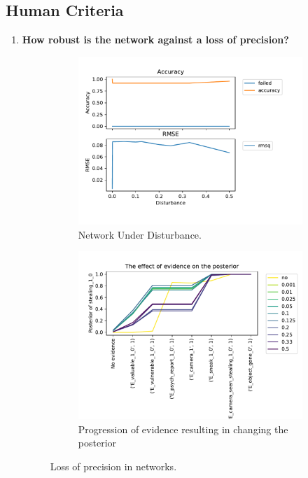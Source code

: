 \subsection{Human Criteria}
\begin{enumerate}
\item \textbf{How robust is the network against a loss of precision?}

\begin{figure}[htbp]
\begin{center}
\begin{subfigure}{.5\textwidth}
\includegraphics[width=0.9\linewidth]{../experiments/GroteMarkt/plots/performance_GroteMarkt.pdf}
\caption{Network Under Disturbance.}
\label{dist}
\end{subfigure}%
\begin{subfigure}{.5\textwidth}
\includegraphics[width=0.9\linewidth]{../experiments/GroteMarkt/plots/posterior_GroteMarkt.pdf}
\caption{ Progression of evidence resulting in changing the posterior}
\label{post}
\end{subfigure}
\end{center}
\caption{Loss of precision in networks.}
\label{pLoss}
\end{figure}


\end{enumerate}
